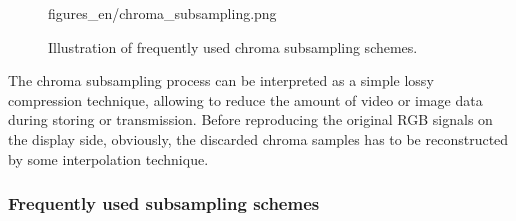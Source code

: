 \begin{figure}[]
	\centering
	\begin{overpic}[width = 1\columnwidth ]{figures_en/chroma_subsampling.png}
 	\end{overpic}
	\caption{Illustration of frequently used chroma subsampling schemes.}
	\label{Fig:chroma_subsampling}
\end{figure}

The chroma subsampling process can be interpreted as a simple lossy compression technique, allowing to reduce the amount of video or image data during storing or transmission.
Before reproducing the original RGB signals on the display side, obviously, the discarded chroma samples has to be reconstructed by some interpolation technique.

\subsubsection*{Frequently used subsampling schemes}

